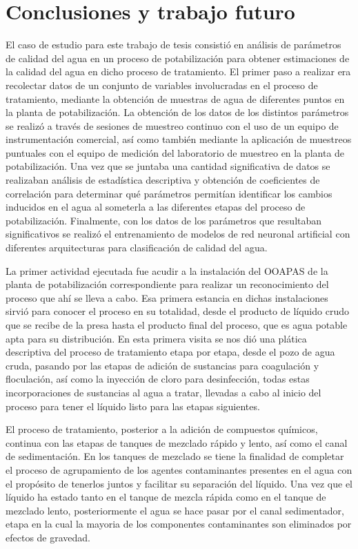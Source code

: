 \chapter{Conclusiones y trabajo futuro}
\label{ch:conclusiones}

El caso de estudio para este trabajo de tesis consistió en análisis de parámetros de calidad del agua en un proceso de potabilización para obtener estimaciones de la calidad del agua en dicho proceso de tratamiento. El primer 
paso a realizar era recolectar datos de un conjunto de variables involucradas en el proceso de tratamiento, mediante la obtención de muestras de agua de diferentes puntos en la planta de potabilización. La obtención de los 
datos de los distintos parámetros se realizó a través de sesiones de muestreo continuo con el uso de un equipo de instrumentación comercial, así como también mediante la aplicación de muestreos puntuales con el equipo de 
medición del laboratorio de muestreo en la planta de potabilización. Una vez que se juntaba una cantidad significativa de datos se realizaban análisis de estadística descriptiva y obtención de coeficientes de correlación 
para determinar qué parámetros permitían identificar los cambios inducidos en el agua al someterla a las diferentes etapas del proceso de potabilización. Finalmente, con los datos de los parámetros que resultaban significativos 
se realizó el entrenamiento de modelos de red neuronal artificial con diferentes arquitecturas para clasificación de calidad del agua.

La primer actividad ejecutada fue acudir a la instalación del OOAPAS de la planta de potabilización correspondiente para realizar un reconocimiento del proceso que ahí se lleva a cabo. Esa primera estancia en dichas instalaciones 
sirvió para conocer el proceso en su totalidad, desde el producto de líquido crudo que se recibe de la presa hasta el producto final del proceso, que es agua potable apta para su distribución. En esta primera visita se nos 
dió una plática descriptiva del proceso de tratamiento etapa por etapa, desde el pozo de agua cruda, pasando por las etapas de adición de sustancias para coagulación y floculación, así como la inyección de cloro para desinfección,
todas estas incorporaciones de sustancias al agua a tratar, llevadas a cabo al inicio del proceso para tener el líquido listo para las etapas siguientes.

El proceso de tratamiento, posterior a la adición de compuestos químicos, continua con las etapas de tanques de mezclado rápido y lento, así como el canal de sedimentación. En los tanques de mezclado se tiene la finalidad 
de completar el proceso de agrupamiento de los agentes contaminantes presentes en el agua con el propósito de tenerlos juntos y facilitar su separación del líquido. Una vez que el líquido ha estado tanto en el tanque de 
mezcla rápida como en el tanque de mezclado lento, posteriormente el agua se hace pasar por el canal sedimentador, etapa en la cual la mayoria de los componentes contaminantes son eliminados por efectos de gravedad.


